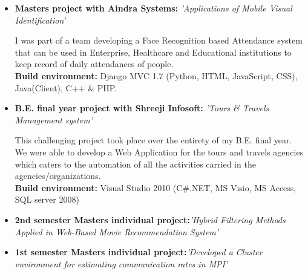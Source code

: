 \documentclass[11pt,a4paper,sans]{moderncv}        %
\begin{document}
\vspace{5pt}

\begin{itemize}

\item{\textbf{Masters project with Aindra Systems:} \textit{'Applications of Mobile Visual Identification'}

\vspace{3pt}

\small{I was part of a team developing a Face Recognition based Attendance system that can be used in Enterprise, Healthcare and Educational institutions to keep record of daily attendances of people.}
\\ \textbf{ Build environment:} Django MVC 1.7 (Python, HTML, JavaScript, CSS), Java(Client), C++ \& PHP.
}

\newpage

\item{\textbf{B.E. final year project with Shreeji Infosoft:} \textit{'Tours \& Travels Management system'}

\vspace{3pt}

\small{This challenging project took place over the entirety of my B.E. final year. We were able to develop a Web Application for the tours and travels agencies which caters to the automation of all the activities carried in the agencies/organizations.}
\\ \textbf{ Build environment:} Visual Studio 2010 (C\#.NET, MS Visio, MS Access, SQL server 2008)
}

\vspace{8pt}

\item{\textbf{2nd semester Masters individual project:}\textit{'Hybrid Filtering Methods Applied in Web-Based Movie Recommendation System'}}

\vspace{8pt}

\item{\textbf{1st semester Masters individual project:}\textit{'Developed a Cluster environment for estimating communication rates in MPI'}}




\end{itemize}
\end{document}
